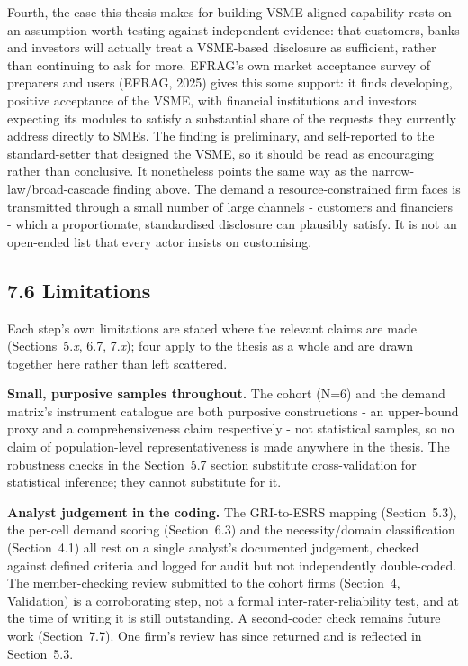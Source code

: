 \documentclass[
]{article}
\newcounter{none} %
\begin{document}
Fourth, the case this thesis makes for building VSME-aligned capability rests
on an assumption worth testing against independent evidence: that customers,
banks and investors will actually treat a VSME-based disclosure as
sufficient, rather than continuing to ask for more. EFRAG's own market
acceptance survey of preparers and users (EFRAG, 2025) gives this some
support: it finds developing, positive acceptance of the VSME, with
financial institutions and investors expecting its modules to satisfy a
substantial share of the requests they currently address directly to SMEs.
The finding is preliminary, and self-reported to the standard-setter that
designed the VSME, so it should be read as encouraging rather than conclusive.
It nonetheless points the same way as the narrow-law/broad-cascade finding
above. The demand a resource-constrained firm faces is transmitted through a small
number of large channels - customers and financiers - which a proportionate,
standardised disclosure can plausibly satisfy. It is not an open-ended list that
every actor insists on customising.

\subsection{7.6 Limitations}\label{discussion-limitations}

Each step's own limitations are stated where the relevant claims are made
(Sections~5.\emph{x}, 6.7, 7.\emph{x}); four apply to the thesis as a whole and
are drawn together here rather than left scattered.

\textbf{Small, purposive samples throughout.} The cohort (N=6) and the demand
matrix's instrument catalogue are both purposive constructions - an
upper-bound proxy and a comprehensiveness claim respectively - not
statistical samples, so no claim of population-level representativeness is
made anywhere in the thesis. The robustness checks in the
Section~5.7 section substitute cross-validation for
statistical inference; they cannot substitute for it.

\textbf{Analyst judgement in the coding.} The GRI-to-ESRS mapping
(Section~5.3), the per-cell demand scoring (Section~6.3) and the
necessity/domain classification (Section~4.1) all rest on a single analyst's
documented judgement, checked against defined criteria and logged for audit
but not independently double-coded. The member-checking review submitted to the
cohort firms (Section~4, Validation) is a corroborating step, not a formal
inter-rater-reliability test, and at the time of writing it is still outstanding.
A second-coder check remains future work (Section~7.7). One firm's review has
since returned and is reflected in Section~5.3.
\end{document}
